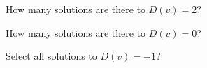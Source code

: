 \documentclass{ximera}
\begin{document}
\begin{exercise}
How many solutions are there to $D(v) = 2$?
\begin{selectAll}
\end{selectAll}
\end{exercise}




\begin{exercise}
How many solutions are there to $D(v) = 0$?
\begin{selectAll}
\end{selectAll}
\end{exercise}




\begin{exercise}
Select all solutions to $D(v) = -1$?
\begin{selectAll}
\end{selectAll}
\end{exercise}
\end{document}
